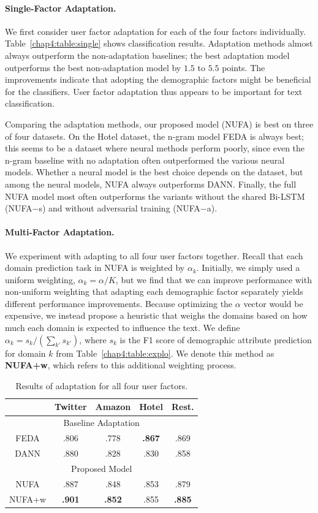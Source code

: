 \paragraph{Single-Factor Adaptation.} We first consider user factor adaptation for each of the four factors individually. 
Table~\ref{chap4:table:single} shows classification results.
Adaptation methods almost always outperform the non-adaptation baselines;
the best adaptation model outperforms the best non-adaptation model by $1.5$ to $5.5$ points. 
The improvements indicate that adopting the demographic factors might be beneficial for the classifiers. User factor adaptation thus appears to be important for text classification. 

Comparing the adaptation methods,
our proposed model (NUFA) is best on three of four datasets.
On the Hotel dataset, the n-gram model FEDA is always best;
this seems to be a dataset where neural methods perform poorly, since even the n-gram baseline with no adaptation often outperformed the various neural models. 
Whether a neural model is the best choice depends on the dataset,
but among the neural models, NUFA always outperforms DANN.
Finally, the full NUFA model most often outperforms the variants without the shared Bi-LSTM (NUFA$-$s) and without adversarial training (NUFA$-$a). 


\paragraph{Multi-Factor Adaptation.} We experiment with adapting to all four user factors together.
Recall that each domain prediction task in NUFA is weighted by $\alpha_k$.
Initially, we simply used a uniform weighting, $\alpha_k = \alpha/K$,
but we find that we can improve performance with non-uniform weighting that adapting each demographic factor separately yields different performance improvements.
Because optimizing the $\alpha$ vector would be expensive, 
we instead propose a heuristic that weighs the domains
based on how much each domain is expected to influence the text.
We define $\alpha_k = s_k / (\sum_{k'} s_{k'})$, where $s_k$ is the F1 score of demographic attribute prediction for domain $k$ from Table~\ref{chap4:table:explo}.
We denote this method as {\bf NUFA+w}, which refers to this additional weighting process.

\begin{table}[htp]
\centering
\begin{tabular}{c|c|c|c|c}
 & Twitter & Amazon & Hotel & Rest. \\\hline
\multicolumn{5}{c}{Baseline Adaptation} \\\hline
FEDA & .806 & .778 & \bf .867 & .869 \\\hline
DANN & .880 & .828 & .830 & .858 \\\hline
\multicolumn{5}{c}{Proposed Model} \\\hline
NUFA & .887 & .848 & .853 & .879 \\
NUFA+w & \bf .901 & \bf .852 & .855 & \bf .885 \\
\end{tabular}
\caption{Results of adaptation for all four user factors.}
\label{chap4:table:multi}
\end{table}

